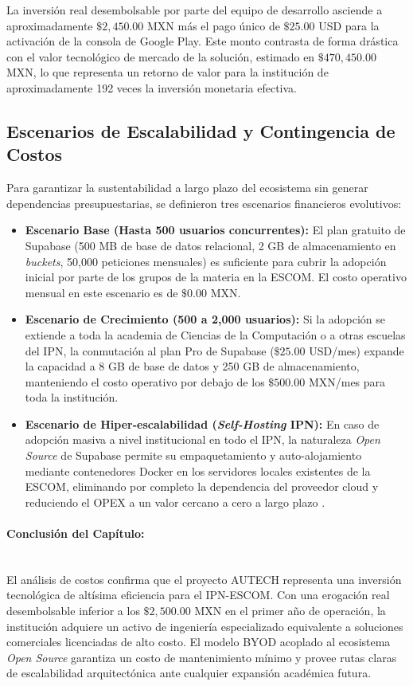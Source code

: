 La inversión real desembolsable por parte del equipo de desarrollo asciende a aproximadamente $\$2,450.00$ MXN más el pago único de $\$25.00$ USD para la activación de la consola de Google Play. Este monto contrasta de forma drástica con el valor tecnológico de mercado de la solución, estimado en $\$470{,}450.00$ MXN, lo que representa un retorno de valor para la institución de aproximadamente 192 veces la inversión monetaria efectiva.
\subsection{Escenarios de Escalabilidad y Contingencia de Costos}
\label{subsec:escenarios_escalabilidad}

Para garantizar la sustentabilidad a largo plazo del ecosistema sin generar dependencias presupuestarias, se definieron tres escenarios financieros evolutivos:
\begin{itemize}
    \item \textbf{Escenario Base (Hasta 500 usuarios concurrentes):} El plan gratuito de Supabase (500 MB de base de datos relacional, 2 GB de almacenamiento en \textit{buckets}, 50,000 peticiones mensuales) es suficiente para cubrir la adopción inicial por parte de los grupos de la materia en la ESCOM. El costo operativo mensual en este escenario es de $\$0.00$ MXN.
    \item \textbf{Escenario de Crecimiento (500 a 2,000 usuarios):} Si la adopción se extiende a toda la academia de Ciencias de la Computación o a otras escuelas del IPN, la conmutación al plan Pro de Supabase ($\$25.00$ USD/mes) expande la capacidad a 8 GB de base de datos y 250 GB de almacenamiento, manteniendo el costo operativo por debajo de los $\$500.00$ MXN/mes para toda la institución.
    \item \textbf{Escenario de Hiper-escalabilidad (\textit{Self-Hosting} IPN):} En caso de adopción masiva a nivel institucional en todo el IPN, la naturaleza \textit{Open Source} de Supabase permite su empaquetamiento y auto-alojamiento mediante contenedores Docker en los servidores locales existentes de la ESCOM, eliminando por completo la dependencia del proveedor cloud y reduciendo el OPEX a un valor cercano a cero a largo plazo \cite{supabase2024}.
\end{itemize}

\paragraph{Conclusión del Capítulo:}~\\
El análisis de costos confirma que el proyecto AUTECH representa una inversión tecnológica de altísima eficiencia para el IPN-ESCOM. Con una erogación real desembolsable inferior a los $\$2,500.00$ MXN en el primer año de operación, la institución adquiere un activo de ingeniería especializado equivalente a soluciones comerciales licenciadas de alto costo. El modelo BYOD acoplado al ecosistema \textit{Open Source} garantiza un costo de mantenimiento mínimo y provee rutas claras de escalabilidad arquitectónica ante cualquier expansión académica futura.

